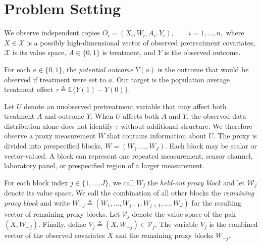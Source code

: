 \section{Problem Setting}
\label{sec:setup}

We observe independent copies
\(O_i=(X_i,W_i,A_i,Y_i), \qquad i=1,\ldots,n,\)
where $X\in\mathcal X$ is a possibly high-dimensional vector of observed pretreatment covariates, $\mathcal X$ is its value space, $A\in\{0,1\}$ is treatment, and $Y$ is the observed outcome.

For each $a\in\{0,1\}$, the \emph{potential outcome} $Y(a)$ is the outcome that would be observed if treatment were set to $a$. Our target is the population average treatment effect
\(\tau\triangleq\mathbb E\{Y(1)-Y(0)\}.\)

Let $U$ denote an unobserved pretreatment variable that may affect both treatment $A$ and outcome $Y$. When $U$ affects both $A$ and $Y$, the observed-data distribution alone does not identify $\tau$ without additional structure. We therefore observe a proxy measurement $W$ that contains information about $U$. The proxy is divided into prespecified blocks,
\(W=(W_1,\ldots,W_J).\)
Each block may be scalar or vector-valued. A block can represent one repeated measurement, sensor channel, laboratory panel, or prespecified region of a larger measurement.

For each block index $j\in\{1,\ldots,J\}$, we call $W_j$ the \emph{held-out proxy block} and let $\mathcal W_j$ denote its value space. We call the combination of all other blocks the \emph{remaining proxy block} and write
\(W_{-j} \triangleq (W_1,\ldots,W_{j-1},W_{j+1},\ldots,W_J)\)
for the resulting vector of remaining proxy blocks. Let $\mathcal V_j$ denote the value space of the pair $(X,W_{-j})$. Finally, define
\(V_j\triangleq(X,W_{-j})\in\mathcal V_j.\)
The variable $V_j$ is the combined vector of the observed covariates $X$ and the remaining proxy blocks $W_{-j}$.
